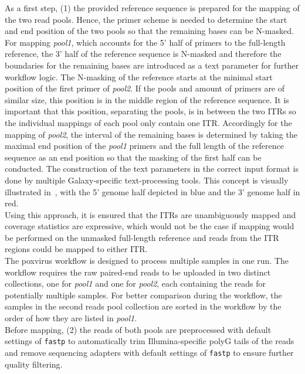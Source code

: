 As a first step, (1) the provided reference sequence is prepared for the mapping of the two read pools. Hence, the primer scheme is needed to determine the start and end position of the two pools so that the remaining bases can be N-masked. For mapping \textit{pool1}, which accounts for the 5' half of primers to the full-length reference, the 3' half of the reference sequence is N-masked and therefore the boundaries for the remaining bases are introduced as a text parameter for further workflow logic. The N-masking of the reference starts at the minimal start position of the first primer of \textit{pool2}. If the pools and amount of primers are of similar size, this position is in the middle region of the reference sequence. It is important that this position, separating the pools, is in between the two \acp{ITR} so the individual mappings of each pool only contain one \ac{ITR}. Accordingly for the mapping of \textit{pool2}, the interval of the remaining bases is determined by taking the maximal end position of the \textit{pool1} primers and the full length of the reference sequence as an end position so that the masking of the first half can be conducted. The construction of the text parameters in the correct input format is done by multiple Galaxy-specific text-processing tools. This concept is visually illustrated in~, with the 5' genome half depicted in blue and the 3' genome half in red. \\
Using this approach, it is ensured that the \acp{ITR} are unambiguously mapped and coverage statistics are expressive, which would not be the case if mapping would be performed on the unmasked full-length reference and reads from the \ac{ITR} regions could be mapped to either \ac{ITR}.\\
The poxvirus workflow is designed to process multiple samples in one run. The workflow requires the raw paired-end reads to be uploaded in two distinct collections, one for \textit{pool1} and one for \textit{pool2}, each containing the reads for potentially multiple samples. For better comparison during the workflow, the samples in the second reads pool collection are sorted in the workflow by the order of how they are listed in \textit{pool1}.\\
Before mapping, (2) the reads of both pools are preprocessed with default settings of \texttt{fastp} to automatically trim Illumina-specific polyG tails of the reads and remove sequencing adapters with default settings of \texttt{fastp} to ensure further quality filtering.\\
